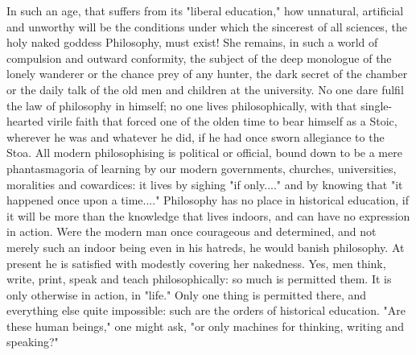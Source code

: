 In such an age, that suffers from its "liberal education," how
unnatural, artificial and unworthy will be the conditions under which
the sincerest of all sciences, the holy naked goddess Philosophy,
must exist! She remains, in such a world of compulsion and outward
conformity, the subject of the deep monologue of the lonely wanderer
or the chance prey of any hunter, the dark secret of the chamber or
the daily talk of the old men and children at the university. No one
dare fulfil the law of philosophy in himself; no one lives
philosophically, with that single-hearted virile faith that forced
one of the olden time to bear himself as a Stoic, wherever he was and
whatever he did, if he had once sworn allegiance to the Stoa. All
modern philosophising is political or official, bound down to be a
mere phantasmagoria of learning by our modern governments, churches,
universities, moralities and cowardices: it lives by sighing "if
only...." and by knowing that "it happened once upon a time...."
Philosophy has no place in historical education, if it will be more
than the knowledge that lives indoors, and can have no expression in
action. Were the modern man once courageous and determined, and not
merely such an indoor being even in his hatreds, he would banish
philosophy. At present he is satisfied with modestly covering her
nakedness. Yes, men think, write, print, speak and teach
philosophically: so much is permitted them. It is only otherwise in
action, in "life." Only one thing is permitted there, and everything
else quite impossible: such are the orders of historical education.
"Are these human beings," one might ask, "or only machines for
thinking, writing and speaking?"

